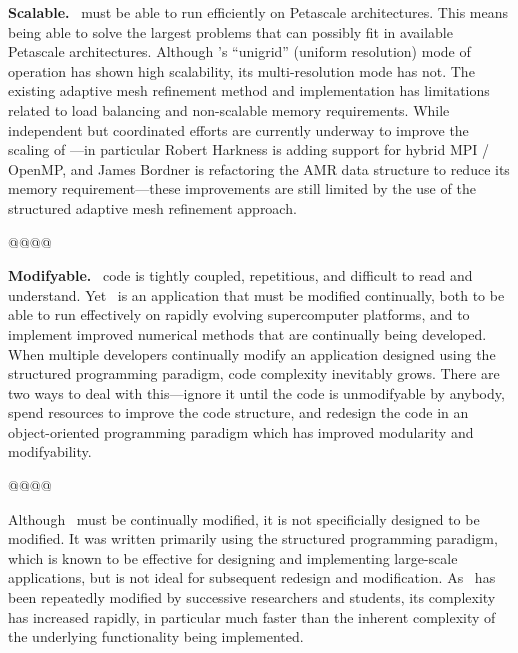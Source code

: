 \documentclass[11pt]{article}
\begin{document}

    \textbf{Scalable.} \cello\ must be able to run efficiently on Petascale
    architectures.  This means being able to solve the largest
    problems that can possibly fit in available Petascale
    architectures.  Although \enzo's ``unigrid'' (uniform resolution)
    mode of operation has shown high scalability, its multi-resolution
    mode has not.  The existing adaptive mesh refinement method and
    implementation has limitations related to load balancing and
    non-scalable memory requirements.  While independent but
    coordinated efforts are currently underway to improve the scaling
    of \enzo---in particular Robert Harkness is adding support for
    hybrid MPI / OpenMP, and James Bordner is refactoring the AMR
    data structure to reduce its memory requirement---these improvements
    are still limited by the use of the structured adaptive mesh
    refinement approach.


@@@@

    \textbf{Modifyable.} \enzo\ code is tightly coupled, repetitious,
    and difficult to read and understand.  Yet \enzo\ is an
    application that must be modified continually, both to be able to
    run effectively on rapidly evolving supercomputer platforms, and
    to implement improved numerical methods that are continually being
    developed.  When multiple developers continually modify an application
    designed using the structured programming paradigm, code complexity
    inevitably grows.  There are two ways to deal with this---ignore it
    until the code is unmodifyable by anybody, spend resources
    to improve the code structure, and redesign the code  in an
    object-oriented programming paradigm which has improved modularity
    and modifyability.

@@@@    

    Although \enzo\ must be continually modified, it is not specificially
    designed to be modified.  It was written primarily using the
    structured programming paradigm, which is known to be effective
    for designing and implementing large-scale applications, but is
    not ideal for subsequent redesign and modification.  As \enzo\ has
    been repeatedly modified by successive researchers and students,
    its complexity has increased rapidly, in particular much faster
    than the inherent complexity of the underlying functionality being
    implemented.

\end{document}
